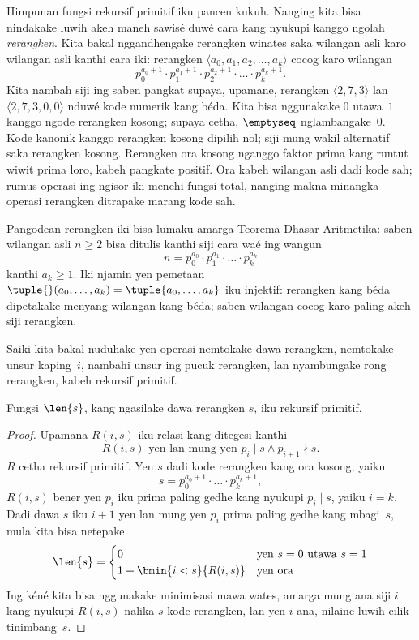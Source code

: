 \documentclass[../../../include/open-logic-section]{subfiles}
\begin{document}

Himpunan fungsi rekursif primitif iku pancen kukuh.
Nanging kita bisa nindakake luwih akeh maneh sawisé
duwé cara kang nyukupi kanggo ngolah \emph{rerangken}.
Kita bakal nggandhengake rerangken winates saka wilangan
asli karo wilangan asli kanthi cara iki: rerangken
$\langle a_0, a_1, a_2, \dots, a_k \rangle$ cocog karo
wilangan
\[
p_0^{a_0+1} \cdot p_1^{a_1+1} \cdot p_2^{a_2+1} \cdot \dots \cdot
p_k^{a_k+1}.
\]
Kita nambah siji ing saben pangkat supaya, upamane,
rerangken $\langle 2, 7, 3\rangle$ lan
$\langle 2, 7, 3, 0, 0 \rangle$ nduwé kode numerik
kang béda. Kita bisa nggunakake $0$ utawa~$1$ kanggo
ngode rerangken kosong; supaya cetha, $\emptyseq$
nglambangake~$0$. Kode kanonik kanggo rerangken kosong dipilih nol; siji mung wakil alternatif saka rerangken kosong. Rerangken ora kosong nganggo faktor prima kang runtut wiwit prima loro, kabeh pangkate positif. Ora kabeh wilangan asli dadi kode sah; rumus operasi ing ngisor iki menehi fungsi total, nanging makna minangka operasi rerangken ditrapake marang kode sah.

Pangodean rerangken iki bisa lumaku amarga Teorema
Dhasar Aritmetika: saben wilangan asli $n \ge 2$ bisa
ditulis kanthi siji cara waé ing wangun
\[
n = p_0^{a_0} \cdot p_1^{a_1} \cdot \dots \cdot p_k^{a_k}
\]
kanthi $a_k \ge 1$. Iki njamin yen pemetaan
$\tuple{}(a_0, \dots, a_k) = \tuple{a_0, \dots, a_k}$
iku injektif: rerangken kang béda dipetakake menyang
wilangan kang béda; saben wilangan cocog karo paling
akeh siji rerangken.

Saiki kita bakal nuduhake yen operasi nemtokake dawa
rerangken, nemtokake unsur kaping~$i$, nambahi unsur
ing pucuk rerangken, lan nyambungake rong rerangken,
kabeh rekursif primitif.

\begin{prop}
  Fungsi $\len{s}$, kang ngasilake dawa rerangken
  $s$, iku rekursif primitif.
\end{prop}

\begin{proof}
  Upamana $R(i, s)$ iku relasi kang ditegesi kanthi
  \[
  R(i, s) \text{ yen lan mung yen }
  p_i \mid s \land p_{i+1} \nmid s.
  \]
  $R$ cetha rekursif primitif. Yen $s$ dadi kode
  rerangken kang ora kosong, yaiku
  \[
  s = p_0^{a_0+1} \cdot \dots \cdot p_{k}^{a_{k}+1},
  \]
  $R(i,s)$ bener yen $p_i$ iku prima paling gedhe
  kang nyukupi $p_i \mid s$, yaiku $i = k$.
  Dadi dawa $s$ iku $i+1$ yen lan mung yen
  $p_i$ prima paling gedhe kang mbagi~$s$,
  mula kita bisa netepake
  \[
  \len{s} =
  \begin{cases}
    0 & \text{yen $s = 0$ utawa $s = 1$} \\
    1 + \bmin{i < s}{R(i, s)} & \text{yen ora}
  \end{cases}
  \]
  Ing kéné kita bisa nggunakake minimisasi mawa wates,
  amarga mung ana siji $i$ kang nyukupi $R(i,s)$
  nalika $s$ kode rerangken, lan yen $i$ ana,
  nilaine luwih cilik tinimbang~$s$.
\end{proof}
\end{document}
